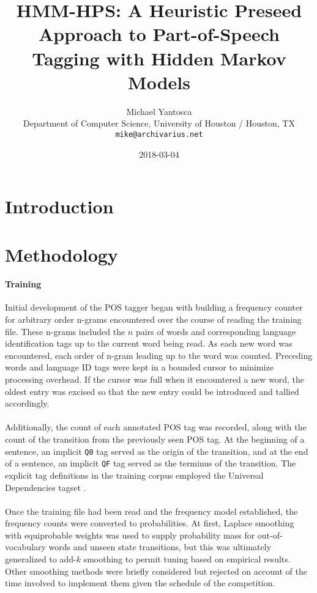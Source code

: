 \documentclass[11pt,a4paper]{article}
\title{HMM-HPS: A Heuristic Preseed Approach to Part-of-Speech Tagging with Hidden Markov Models}
\author{Michael Yantosca \\
  Department of Computer Science, University of Houston / Houston, TX \\
  {\tt mike@archivarius.net} \\}
\date{2018-03-04}
\begin{document}
\maketitle
\begin{abstract}
\end{abstract}

\section{Introduction}

\section{Methodology}

\paragraph{Training}
Initial development of the POS tagger began with building a frequency counter for
arbitrary order n-grams encountered over the course of reading the training file.
These n-grams included the $n$ pairs of words and corresponding language identification
tags up to the current word being read. As each new word was encountered, each
order of n-gram leading up to the word was counted. Preceding words and language ID
tags were kept in a bounded cursor to minimize processing overhead. If the cursor
was full when it encountered a new word, the oldest entry was excised so that the
new entry could be introduced and tallied accordingly.

\paragraph{}
Additionally, the count of each annotated POS tag was recorded, along with the count
of the transition from the previously seen POS tag. At the beginning of a sentence,
an implicit \texttt{Q0} tag served as the origin of the transition, and at the end
of a sentence, an implicit \texttt{QF} tag served as the terminus of the transition.
The explicit tag definitions in the training corpus employed the Universal Dependencies
tagset \cite{UPOS}.

\paragraph{}
Once the training file had been read and the frequency model established,
the frequency counts were converted to probabilities. At first, Laplace smoothing
\cite[47]{JurafskyMartin}
with equiprobable weights was used to supply probability mass for out-of-vocabulary
words and unseen state transitions, but this was ultimately generalized to add-$k$
smoothing \cite[49]{JurafskyMartin} to permit tuning based on empirical results.
Other smoothing methods were briefly considered but rejected on account of the time
involved to implement them given the schedule of the competition.
\end{document}
